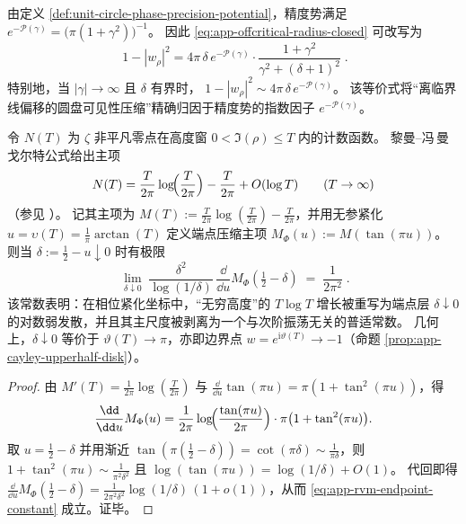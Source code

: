 \begin{remark}\label{rem:app-offcritical-radius-precision-potential}
由定义 \ref{def:unit-circle-phase-precision-potential}，精度势满足
\(
e^{-\mathcal{P}(\gamma)}=\bigl(\pi(1+\gamma^{2})\bigr)^{-1}
\)。
因此 \eqref{eq:app-offcritical-radius-closed} 可改写为
\begin{equation}\label{eq:app-offcritical-radius-via-precision-potential}
\boxed{\;
1-|w_{\rho}|^{2}
=4\pi\,\delta\,e^{-\mathcal{P}(\gamma)}\cdot\frac{1+\gamma^{2}}{\gamma^{2}+(\delta+1)^{2}}\; }.
\end{equation}
特别地，当 \(|\gamma|\to\infty\) 且 \(\delta\) 有界时，
\(
1-|w_{\rho}|^{2}\sim 4\pi\,\delta\,e^{-\mathcal{P}(\gamma)}
\)。
该等价式将“离临界线偏移的圆盘可见性压缩”精确归因于精度势的指数因子 \(e^{-\mathcal{P}(\gamma)}\)。
\end{remark}



\begin{remark}\label{rem:app-rvm-endpoint-constant}
令 \(N(T)\) 为 \(\zeta\) 非平凡零点在高度窗 \(0<\Im(\rho)\le T\) 内的计数函数。
黎曼--冯\,曼戈尔特公式给出主项
\[
N(T)=\frac{T}{2\pi}\log\!\Bigl(\frac{T}{2\pi}\Bigr)-\frac{T}{2\pi}+O(\log T)\qquad(T\to\infty)
\]
（参见 \cite{Apostol1976}）。
记其主项为
\(
M(T):=\frac{T}{2\pi}\log(\frac{T}{2\pi})-\frac{T}{2\pi}
\)，并用无参紧化 \(u=\upsilon(T)=\frac{1}{\pi}\arctan(T)\) 定义端点压缩主项
\(
M_{\Phi}(u):=M(\tan(\pi u))
\)。
则当 \(\delta:=\tfrac12-u\downarrow 0\) 时有极限
\begin{equation}\label{eq:app-rvm-endpoint-constant}
\boxed{\;
\lim_{\delta\downarrow 0}\;
\frac{\delta^{2}}{\log(1/\delta)}\,
\frac{\dd}{\dd u}M_{\Phi}\!\left(\tfrac12-\delta\right)
\;=\;\frac{1}{2\pi^{2}}\; }.
\end{equation}
该常数表明：在相位紧化坐标中，“无穷高度”的 \(T\log T\) 增长被重写为端点层 \(\delta\downarrow 0\) 的对数弱发散，并且其主尺度被剥离为一个与次阶振荡无关的普适常数。
几何上，\(\delta\downarrow 0\) 等价于 \(\vartheta(T)\to\pi\)，亦即边界点 \(w=e^{\mathrm{i}\vartheta(T)}\to-1\)（命题 \ref{prop:app-cayley-upperhalf-disk}）。
\end{remark}
\begin{proof}
由 \(M'(T)=\frac{1}{2\pi}\log(\frac{T}{2\pi})\) 与 \(\frac{\dd}{\dd u}\tan(\pi u)=\pi(1+\tan^2(\pi u))\)，得
\[
\frac{\dd}{\dd u}M_{\Phi}(u)
=\frac{1}{2\pi}\log\!\Bigl(\frac{\tan(\pi u)}{2\pi}\Bigr)\cdot \pi\bigl(1+\tan^2(\pi u)\bigr).
\]
取 \(u=\tfrac12-\delta\) 并用渐近 \(\tan(\pi(\tfrac12-\delta))=\cot(\pi\delta)\sim \frac{1}{\pi\delta}\)，则
\(
1+\tan^2(\pi u)\sim \frac{1}{\pi^2\delta^2}
\)
且
\(
\log(\tan(\pi u))=\log(1/\delta)+O(1)
\)。
代回即得
\(
\frac{\dd}{\dd u}M_{\Phi}(\tfrac12-\delta)
=\frac{1}{2\pi^{2}\delta^{2}}\log(1/\delta)\,(1+o(1))
\)，从而 \eqref{eq:app-rvm-endpoint-constant} 成立。证毕。
\end{proof}

